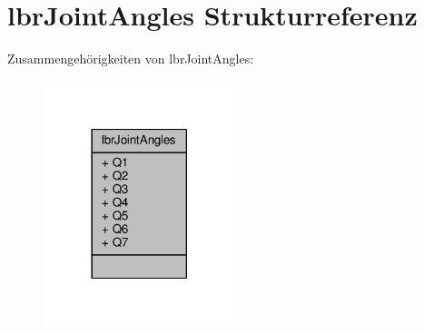 \hypertarget{structlbrJointAngles}{\section{lbr\-Joint\-Angles Strukturreferenz}
\label{structlbrJointAngles}
}


Zusammengehörigkeiten von lbr\-Joint\-Angles\-:
\nopagebreak
\begin{figure}[H]
\begin{center}
\leavevmode
\includegraphics[width=158pt]{structlbrJointAngles__coll__graph}
\end{center}
\end{figure}
